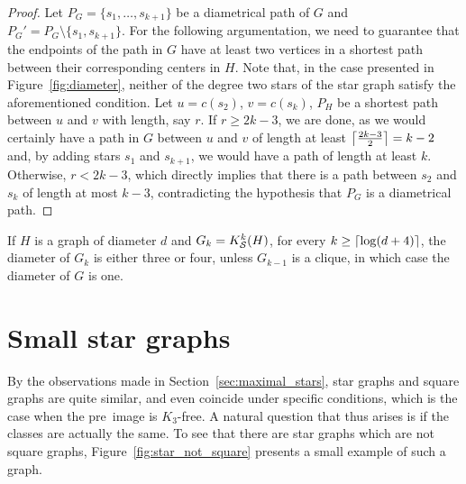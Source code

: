 \begin{proof}
    Let $P_G = \{s_1, \dots, s_{k+1}\}$ be a diametrical path of $G$ and $P_G' = P_G \setminus \{s_1, s_{k+1}\}$.
    For the following argumentation, we need to guarantee that the endpoints of the path in $G$ have at least two vertices in a shortest path between their corresponding centers in $H$.
    Note that, in the case presented in Figure~\ref{fig:diameter}, neither of the degree two stars of the star graph satisfy the aforementioned condition.
    Let $u = c(s_2)$, $v = c(s_k)$, $P_H$ be a shortest path between $u$ and $v$ with length, say $r$.
    If $r \geq 2k - 3$, we are done, as we would certainly have a path in $G$ between $u$ and $v$ of length at least $\left\lceil\frac{2k-3}{2}\right\rceil = k-2$ and, by adding stars $s_1$ and $s_{k+1}$, we would have a path of length at least $k$.
    Otherwise, $r < 2k - 3$, which directly implies that there is a path between $s_2$ and $s_k$ of length at most $k-3$, contradicting the hypothesis that $P_G$ is a diametrical path.
\end{proof}

\begin{corollary}
	If $H$ is a graph of diameter $d$ and $G_k = K_{\mathcal{S}}^k(H)$, for every $k \geq \left\lceil\log (d + 4)\right\rceil$, the diameter of $G_k$ is either three or four, unless $G_{k-1}$ is a clique, in which case the diameter of $G$ is one.
\end{corollary}

\section{Small star graphs}


By the observations made in Section~\ref{sec:maximal_stars}, star graphs and square graphs are quite similar, and even coincide under specific conditions, which is the case when the pre~image is $K_3$-free.
A natural question that thus arises is if the classes are actually the same.
To see that there are star graphs which are not square graphs, Figure~\ref{fig:star_not_square} presents a small example of such a graph.

